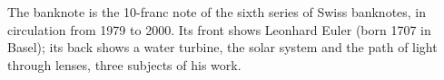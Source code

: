 \begin{aiNote}
The banknote is the 10-franc note of the sixth series of Swiss banknotes, in circulation from 1979 to 2000. Its front shows Leonhard Euler (born 1707 in Basel); its back shows a water turbine, the solar system and the path of light through lenses, three subjects of his work.
\end{aiNote}

\begin{hidden}
\end{hidden}

